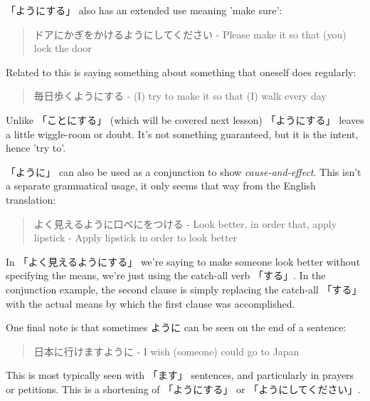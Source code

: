 \documentclass[11pt]{article}
\begin{document}
「ようにする」 also has an extended use meaning 'make sure':
\begin{quote}
ドアにかぎをかけるようにしてください - Please make it so that (you) lock the door
\end{quote}
Related to this is saying something about something that oneself does regularly:
\begin{quote}
毎日歩くようにする - (I) try to make it so that (I) walk every day
\end{quote}
Unlike 「ことにする」 (which will be covered next lesson) 「ようにする」 leaves a little wiggle-room or doubt. It's not something guaranteed, but it is the intent, hence 'try to'.

「ように」 can also be used as a conjunction to show \emph{cause-and-effect}. This isn't a separate grammatical usage, it only seems that way from the English translation:
\begin{quote}
よく見えるように口べにをつける - Look better, in order that, apply lipstick - Apply lipstick in order to look better
\end{quote}
In 「よく見えるようにする」 we're saying to make someone look better without specifying the means, we're just using the catch-all verb 「する」. In the conjunction example, the second clause is simply replacing the catch-all 「する」 with the actual means by which the first clause was accomplished.

One final note is that sometimes ように can be seen on the end of a sentence:
\begin{quote}
日本に行けますように - I wish (someone) could go to Japan
\end{quote}
This is most typically seen with 「ます」 sentences, and particularly in prayers or petitions. This is a shortening of 「ようにする」 or 「ようにしてください」.
\end{document}
